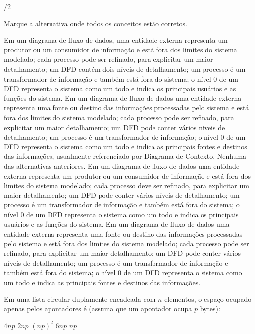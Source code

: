 \documentclass[12pt, addpoints]{exam}
\begin{document}
\begin{questions}
\begin{choices}
/2
\end{choices}

\question

Marque a alternativa onde todos os conceitos estão corretos.


\begin{choices}
\choice Em um diagrama de fluxo de dados, uma entidade externa representa um produtor ou um consumidor de informação e está fora dos limites do sistema modelado; cada processo pode ser refinado, para explicitar um maior detalhamento; um DFD contém dois níveis de detalhamento; um processo é um transformador de informação e também está fora do sistema; o nível 0 de um DFD representa o sistema como um todo e indica os principais usuários e as funções do sistema.
\choice Em um diagrama de fluxo de dados uma entidade externa representa uma fonte ou destino das informações processadas pelo sistema e está fora dos limites do sistema modelado; cada processo pode ser refinado, para explicitar um maior detalhamento; um DFD pode conter vários níveis de detalhamento; um processo é um transformador de informação; o nível 0 de um DFD representa o sistema como um todo e indica as principais fontes e destinos das informações, usualmente referenciado por Diagrama de Contexto.
\choice Nenhuma das alternativas anteriores.
\choice Em um diagrama de fluxo de dados uma entidade externa representa um produtor ou um consumidor de informação e está fora dos limites do sistema modelado; cada processo deve ser refinado, para explicitar um maior detalhamento; um DFD pode conter vários níveis de detalhamento; um processo é um transformador de informação e também está fora do sistema; o nível 0 de um DFD representa o sistema como um todo e indica os principais usuários e as funções do sistema.
\choice Em um diagrama de fluxo de dados uma entidade externa representa uma fonte ou destino das informações processadas pelo sistema e está fora dos limites do sistema modelado; cada processo pode ser refinado, para explicitar um maior detalhamento; um DFD pode conter vários níveis de detalhamento; um processo é um transformador de informação e também está fora do sistema; o nível 0 de um DFD representa o sistema como um todo e indica as principais fontes e destinos das informações.
\end{choices}

\question

Em uma lista circular duplamente encadeada com \( n \) elementos, o espaço ocupado apenas pelos apontadores é (assuma que um apontador ocupa \( p \) bytes):
\begin{choices}
\choice \( 4np \)
\choice \( 2np \)
\choice \( (np)^2 \)
\choice \( 6np \)
\choice \( np \)
\end{choices}


\end{questions}
\end{document}
